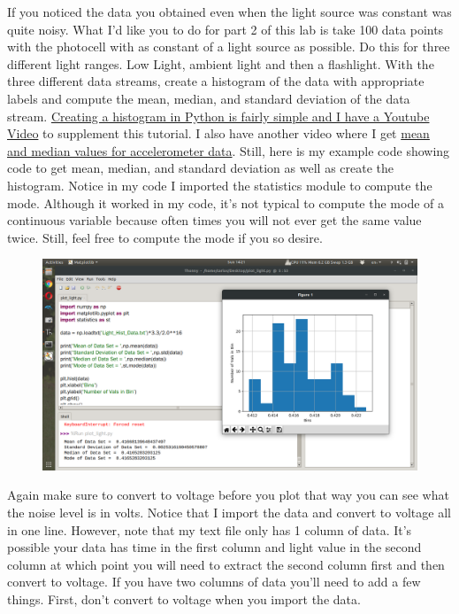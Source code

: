 If you noticed the data you obtained even when the light source was constant was quite noisy. What I’d like you to do for part 2 of this lab is take 100 data points with the photocell with as constant of a light source as possible. Do this for three different light ranges. Low Light, ambient light and then a flashlight. With the three different data streams, create a histogram of the data with appropriate labels and compute the mean, median, and standard deviation of the data stream. \href{https://www.youtube.com/watch?v=bfeJfAWTqzY&list=PL_D7_GvGz-v1RsDs_OdNW65qRjEjmpfQx&index=22&t=0s}{Creating a histogram in Python is fairly simple and I have a Youtube Video} to supplement this tutorial. I also have another video where I get \href{https://www.youtube.com/watch?v=e4xs9Ky7_YI&list=PL_D7_GvGz-v1RsDs_OdNW65qRjEjmpfQx&index=20&t=0s}{mean and median values for accelerometer data}. Still, here is my example code showing code to get mean, median, and standard deviation as well as create the histogram. Notice in my code I imported the statistics module to compute the mode. Although it worked in my code, it’s not typical to compute the mode of a continuous variable because often times you will not ever get the same value twice. Still, feel free to compute the mode if you so desire.
\begin{figure}[H]
  \begin{center}
    \includegraphics[width=\textwidth]{Figures/histogram.png}
  \end{center}
\end{figure}
Again make sure to convert to voltage before you plot that way you can see what the noise level is in volts. Notice that I import the data and convert to voltage all in one line. However, note that my text file only has 1 column of data. It’s possible your data has time in the first column and light value in the second column at which point you will need to extract the second column first and then convert to voltage. If you have two columns of data you’ll need to add a few things. First, don’t convert to voltage when you import the data.
